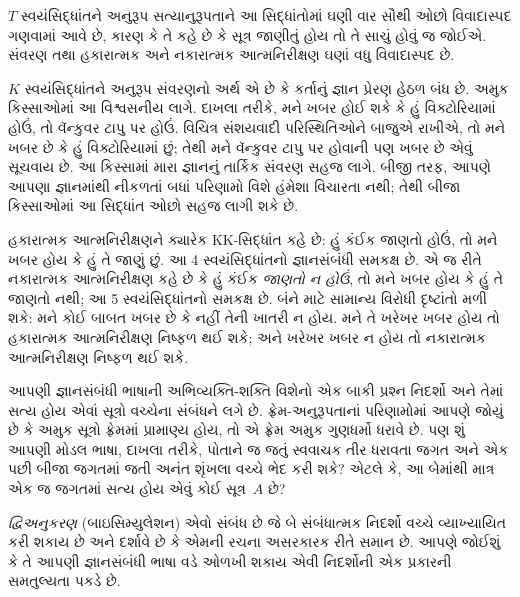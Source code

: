 $T$ સ્વયંસિદ્ધાંતને અનુરૂપ સત્યાનુરૂપતાને આ સિદ્ધાંતોમાં ઘણી વાર
સૌથી ઓછો વિવાદાસ્પદ ગણવામાં આવે છે, કારણ કે તે કહે છે કે
સૂત્ર જાણીતું હોય તો તે સાચું હોવું જ જોઈએ. સંવરણ તથા
હકારાત્મક અને નકારાત્મક આત્મનિરીક્ષણ ઘણાં વધુ વિવાદાસ્પદ છે.

$K$ સ્વયંસિદ્ધાંતને અનુરૂપ સંવરણનો અર્થ એ છે કે કર્તાનું જ્ઞાન
પ્રેરણ હેઠળ બંધ છે. અમુક કિસ્સાઓમાં આ વિશ્વસનીય લાગે. દાખલા
તરીકે, મને ખબર હોઈ શકે કે હું વિક્ટોરિયામાં હોઉં, તો વૅન્કુવર
ટાપુ પર હોઉં. વિચિત્ર સંશયવાદી પરિસ્થિતિઓને બાજુએ રાખીએ, તો
મને ખબર છે કે હું વિક્ટોરિયામાં છું; તેથી મને વૅન્કુવર ટાપુ
પર હોવાની પણ ખબર છે એવું સૂચવાય છે. આ કિસ્સામાં મારા જ્ઞાનનું
તાર્કિક સંવરણ સહજ લાગે. બીજી તરફ, આપણે આપણા જ્ઞાનમાંથી નીકળતાં
બધાં પરિણામો વિશે હંમેશા વિચારતા નથી; તેથી બીજા કિસ્સાઓમાં
આ સિદ્ધાંત ઓછો સહજ લાગી શકે છે.

હકારાત્મક આત્મનિરીક્ષણને ક્યારેક KK-સિદ્ધાંત કહે છે: હું કંઈક
જાણતો હોઉં, તો મને ખબર હોય કે હું તે જાણું છું. આ 4
સ્વયંસિદ્ધાંતનો જ્ઞાનસંબંધી સમકક્ષ છે. એ જ રીતે નકારાત્મક
આત્મનિરીક્ષણ કહે છે કે હું કંઈક \emph{જાણતો ન હોઉં}, તો મને
ખબર હોય કે હું તે જાણતો નથી; આ 5 સ્વયંસિદ્ધાંતનો સમકક્ષ છે.
બંને માટે સામાન્ય વિરોધી દૃષ્ટાંતો મળી શકે: મને કોઈ બાબત ખબર
છે કે નહીં તેની ખાતરી ન હોય. મને તે ખરેખર ખબર હોય તો હકારાત્મક
આત્મનિરીક્ષણ નિષ્ફળ થઈ શકે; અને ખરેખર ખબર ન હોય તો નકારાત્મક
આત્મનિરીક્ષણ નિષ્ફળ થઈ શકે.
\endgroup

\begingroup
\makeatletter{}\makeatother


\label{guunit:OLP-0488}


આપણી જ્ઞાનસંબંધી ભાષાની અભિવ્યક્તિ-શક્તિ વિશેનો એક બાકી પ્રશ્ન
નિદર્શો અને તેમાં સત્ય હોય એવાં સૂત્રો વચ્ચેના સંબંધને લગે છે.
ફ્રેમ-અનુરૂપતાનાં પરિણામોમાં આપણે જોયું છે કે અમુક સૂત્રો
ફ્રેમમાં પ્રામાણ્ય હોય, તો એ ફ્રેમ અમુક ગુણધર્મો ધરાવે છે.
પણ શું આપણી મોડલ ભાષા, દાખલા તરીકે, પોતાને જ જતું સ્વવાચક તીર
ધરાવતા જગત અને એક પછી બીજા જગતમાં જતી અનંત શૃંખલા વચ્ચે ભેદ
કરી શકે? એટલે કે, આ બેમાંથી માત્ર એક જ જગતમાં સત્ય હોય એવું
કોઈ સૂત્ર~$A$ છે?

\emph{દ્વિઅનુકરણ} (બાઇસિમ્યુલેશન) એવો સંબંધ છે જે બે
સંબંધાત્મક નિદર્શો વચ્ચે વ્યાખ્યાયિત કરી શકાય છે અને દર્શાવે
છે કે એમની રચના અસરકારક રીતે સમાન છે. આપણે જોઈશું કે તે
આપણી જ્ઞાનસંબંધી ભાષા વડે ઓળખી શકાય એવી નિદર્શોની એક પ્રકારની
સમતુલ્યતા પકડે છે.


